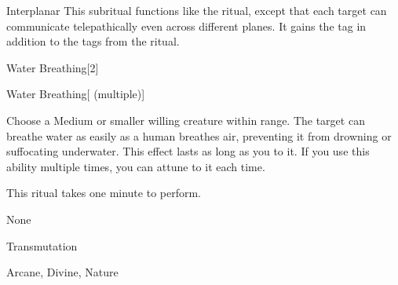 \begin{ability}[\nth{8}]{Interplanar}
This subritual functions like the  ritual, except that each target can communicate telepathically even across different planes.
It gains the  tag in addition to the tags from the  ritual.
\end{ability}
\vspace{0.25em}


\begin{spellsection}{Water Breathing}[2]


\begin{ability}{Water Breathing}[ (multiple)]

Choose a Medium or smaller willing creature within \rngclose range.
The target can breathe water as easily as a human breathes air, preventing it from drowning or suffocating underwater.
This effect lasts as long as you  to it.
If you use this ability multiple times, you can attune to it each time.

This ritual takes one minute to perform.

\end{ability}


 None

 Transmutation

 Arcane, Divine, Nature
\end{spellsection}


